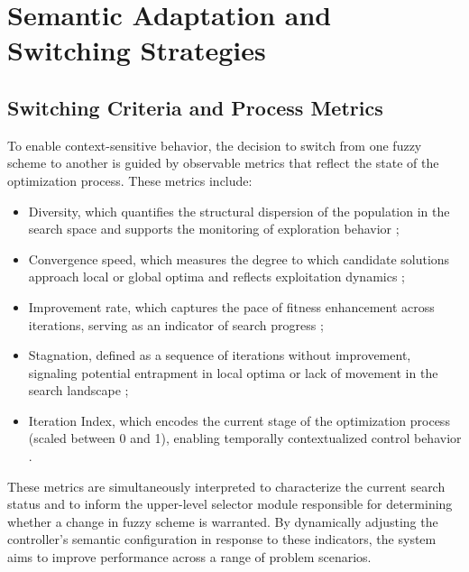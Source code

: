 \section{Semantic Adaptation and Switching Strategies}

\subsection{Switching Criteria and Process Metrics}
To enable context-sensitive behavior, the decision to switch from one fuzzy scheme to another is guided by observable metrics that reflect the state of the optimization process. These metrics include:

\begin{itemize}
    \item Diversity, which quantifies the structural dispersion of the population in the search space and supports the monitoring of exploration behavior \parencite{castillo2017dynamic, patel2022type};
    \item Convergence speed, which measures the degree to which candidate solutions approach local or global optima and reflects exploitation dynamics \parencite{castillo2017dynamic, patel2022type};
    \item Improvement rate, which captures the pace of fitness enhancement across iterations, serving as an indicator of search progress \parencite{castillo2017dynamic, patel2022type};
    \item Stagnation, defined as a sequence of iterations without improvement, signaling potential entrapment in local optima or lack of movement in the search landscape \parencite{castillo2017dynamic, patel2022type};
    \item Iteration Index, which encodes the current stage of the optimization process (scaled between 0 and 1), enabling temporally contextualized control behavior \parencite{peraza2018fuzzy}.
\end{itemize}

These metrics are simultaneously interpreted to characterize the current search status and to inform the upper-level selector module responsible for determining whether a change in fuzzy scheme is warranted. By dynamically adjusting the controller’s semantic configuration in response to these indicators, the system aims to improve performance across a range of problem scenarios.

